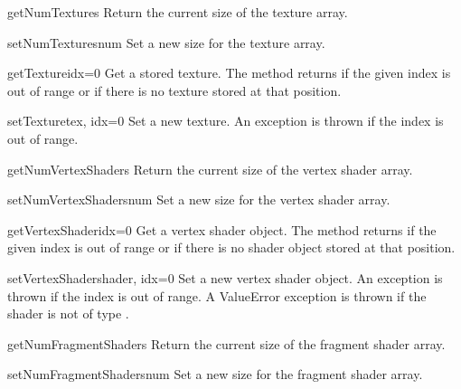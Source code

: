 \begin{methoddesc}{getNumTextures}{}
Return the current size of the texture array.
\end{methoddesc}

\begin{methoddesc}{setNumTextures}{num}
Set a new size for the texture array.
\end{methoddesc}

\begin{methoddesc}{getTexture}{idx=0}
Get a stored texture. The method returns  if the given index
is out of range or if there is no texture stored at that position.
\end{methoddesc}

\begin{methoddesc}{setTexture}{tex, idx=0}
Set a new texture. An  exception is thrown if the 
index is out of range.
\end{methoddesc}

\begin{methoddesc}{getNumVertexShaders}{}
Return the current size of the vertex shader array.
\end{methoddesc}

\begin{methoddesc}{setNumVertexShaders}{num}
Set a new size for the vertex shader array.
\end{methoddesc}

\begin{methoddesc}{getVertexShader}{idx=0}
Get a vertex shader object. The method returns  if the given index
is out of range or if there is no shader object stored at that position.
\end{methoddesc}

\begin{methoddesc}{setVertexShader}{shader, idx=0}
Set a new vertex shader object. An  exception is 
thrown if the index is out of range. A ValueError exception is thrown if the 
shader is not of type .
\end{methoddesc}

\begin{methoddesc}{getNumFragmentShaders}{}
Return the current size of the fragment shader array.
\end{methoddesc}

\begin{methoddesc}{setNumFragmentShaders}{num}
Set a new size for the fragment shader array.
\end{methoddesc}

